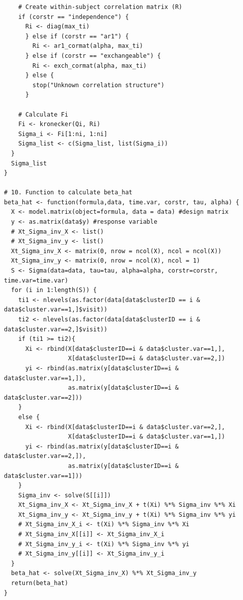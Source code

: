 \documentclass[
]{aft}
\begin{document}
\begin{verbatim}
    # Create within-subject correlation matrix (R)
    if (corstr == "independence") {
      Ri <- diag(max_ti)
      } else if (corstr == "ar1") {
        Ri <- ar1_cormat(alpha, max_ti)
      } else if (corstr == "exchangeable") {
        Ri <- exch_cormat(alpha, max_ti)
      } else {
        stop("Unknown correlation structure")
      }
    
    # Calculate Fi 
    Fi <- kronecker(Qi, Ri)
    Sigma_i <- Fi[1:ni, 1:ni]
    Sigma_list <- c(Sigma_list, list(Sigma_i))
  }
  Sigma_list
}

# 10. Function to calculate beta_hat 
beta_hat <- function(formula,data, time.var, corstr, tau, alpha) {
  X <- model.matrix(object=formula, data = data) #design matrix
  y <- as.matrix(data$y) #response variable
  # Xt_Sigma_inv_X <- list()
  # Xt_Sigma_inv_y <- list()
  Xt_Sigma_inv_X <- matrix(0, nrow = ncol(X), ncol = ncol(X))
  Xt_Sigma_inv_y <- matrix(0, nrow = ncol(X), ncol = 1)
  S <- Sigma(data=data, tau=tau, alpha=alpha, corstr=corstr, time.var=time.var)
  for (i in 1:length(S)) {
    ti1 <- nlevels(as.factor(data[data$clusterID == i & data$cluster.var==1,]$visit))
    ti2 <- nlevels(as.factor(data[data$clusterID == i & data$cluster.var==2,]$visit))
    if (ti1 >= ti2){
      Xi <- rbind(X[data$clusterID==i & data$cluster.var==1,], 
                  X[data$clusterID==i & data$cluster.var==2,])
      yi <- rbind(as.matrix(y[data$clusterID==i & data$cluster.var==1,]), 
                  as.matrix(y[data$clusterID==i & data$cluster.var==2]))
    }
    else {
      Xi <- rbind(X[data$clusterID==i & data$cluster.var==2,], 
                  X[data$clusterID==i & data$cluster.var==1,])
      yi <- rbind(as.matrix(y[data$clusterID==i & data$cluster.var==2,]), 
                  as.matrix(y[data$clusterID==i & data$cluster.var==1]))
    }
    Sigma_inv <- solve(S[[i]])
    Xt_Sigma_inv_X <- Xt_Sigma_inv_X + t(Xi) %*% Sigma_inv %*% Xi
    Xt_Sigma_inv_y <- Xt_Sigma_inv_y + t(Xi) %*% Sigma_inv %*% yi
    # Xt_Sigma_inv_X_i <- t(Xi) %*% Sigma_inv %*% Xi
    # Xt_Sigma_inv_X[[i]] <- Xt_Sigma_inv_X_i
    # Xt_Sigma_inv_y_i <- t(Xi) %*% Sigma_inv %*% yi
    # Xt_Sigma_inv_y[[i]] <- Xt_Sigma_inv_y_i
  }
  beta_hat <- solve(Xt_Sigma_inv_X) %*% Xt_Sigma_inv_y
  return(beta_hat)
}


\end{verbatim}
\end{document}
